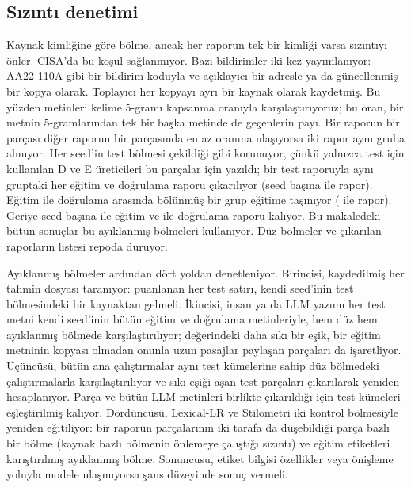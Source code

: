 \documentclass[journal]{IEEEtran}
\begin{document}
\subsection{Sızıntı denetimi}\label{sec:leaksetup}
Kaynak kimliğine göre bölme, ancak her raporun tek bir kimliği varsa sızıntıyı önler. CISA'da bu koşul sağlanmıyor.
Bazı bildirimler iki kez yayımlanıyor: AA22-110A gibi bir bildirim koduyla ve açıklayıcı bir adresle ya da
güncellenmiş bir kopya olarak. Toplayıcı her kopyayı ayrı bir kaynak olarak kaydetmiş. Bu yüzden metinleri kelime
5-gramı kapsanma oranıyla karşılaştırıyoruz; bu oran, bir metnin 5-gramlarından tek bir başka metinde de geçenlerin
payı. Bir raporun bir parçası diğer raporun bir parçasında en az \LeakDup{} oranına ulaşıyorsa iki rapor aynı
gruba alınıyor. Her seed'in test bölmesi çekildiği gibi korunuyor, çünkü yalnızca test için kullanılan D ve E
üreticileri bu parçalar için yazıldı; bir test raporuyla aynı gruptaki her eğitim ve doğrulama raporu çıkarılıyor
(seed başına \LeakRemovedMin{} ile \LeakRemovedMax{} rapor). Eğitim ile doğrulama arasında bölünmüş bir grup eğitime
taşınıyor (\LeakMovedMin{} ile \LeakMovedMax{} rapor). Geriye seed başına \LeakTrainMin{} ile \LeakTrainMax{} eğitim
ve \LeakValMin{} ile \LeakValMax{} doğrulama raporu kalıyor. Bu makaledeki bütün sonuçlar bu ayıklanmış bölmeleri
kullanıyor. Düz bölmeler ve çıkarılan raporların listesi repoda duruyor.

Ayıklanmış bölmeler ardından dört yoldan denetleniyor. Birincisi, kaydedilmiş her tahmin dosyası taranıyor:
puanlanan her test satırı, kendi seed'inin test bölmesindeki bir kaynaktan gelmeli. İkincisi, insan ya da LLM
yazımı her test metni kendi seed'inin bütün eğitim ve doğrulama metinleriyle, hem düz hem ayıklanmış bölmede
karşılaştırılıyor; \LeakStrict{} değerindeki daha sıkı bir eşik, bir eğitim metninin kopyası olmadan onunla uzun
pasajlar paylaşan parçaları da işaretliyor. Üçüncüsü, bütün ana çalıştırmalar aynı test kümelerine sahip düz
bölmedeki çalıştırmalarla karşılaştırılıyor ve sıkı eşiği aşan test parçaları çıkarılarak yeniden hesaplanıyor.
Parça ve bütün LLM metinleri birlikte çıkarıldığı için test kümeleri eşleştirilmiş kalıyor. Dördüncüsü, Lexical-LR
ve Stilometri iki kontrol bölmesiyle yeniden eğitiliyor: bir raporun parçalarının iki tarafa da düşebildiği parça
bazlı bir bölme (kaynak bazlı bölmenin önlemeye çalıştığı sızıntı) ve eğitim etiketleri karıştırılmış ayıklanmış
bölme. Sonuncusu, etiket bilgisi özellikler veya önişleme yoluyla modele ulaşmıyorsa şans düzeyinde sonuç vermeli.
\end{document}

